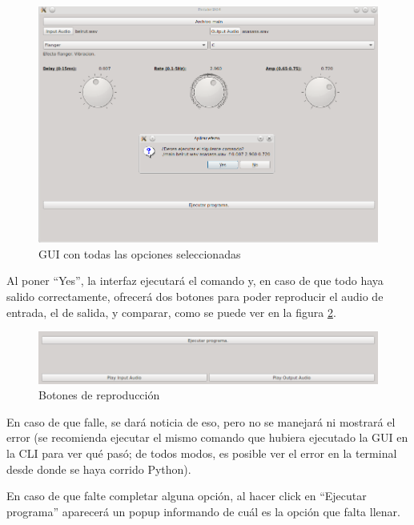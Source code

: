 \begin{figure}[H]
    \centering
    \includegraphics[scale=0.68]{imagenes/gui-complete.png}
    \caption{GUI con todas las opciones seleccionadas}
    \label{fig:gui-complete}
\end{figure}

\vspace{\baselineskip}

Al poner ``Yes'', la interfaz ejecutará el comando y, en caso de que todo haya salido correctamente, ofrecerá dos botones para poder reproducir el audio de entrada, el de salida, y comparar, como se puede ver en la figura \ref{fig:gui-play-buttons}.

\begin{figure}[H]
    \centering
    \includegraphics[scale=0.68]{imagenes/gui-play-buttons.png}
    \caption{Botones de reproducción}
    \label{fig:gui-play-buttons}
\end{figure}

En caso de que falle, se dará noticia de eso, pero no se manejará ni mostrará el error (se recomienda ejecutar el mismo comando que hubiera ejecutado la GUI en la CLI para ver qué pasó; de todos modos, es posible ver el error en la terminal desde donde se haya corrido Python).

En caso de que falte completar alguna opción, al hacer click en ``Ejecutar programa'' aparecerá un popup informando de cuál es la opción que falta llenar. 
